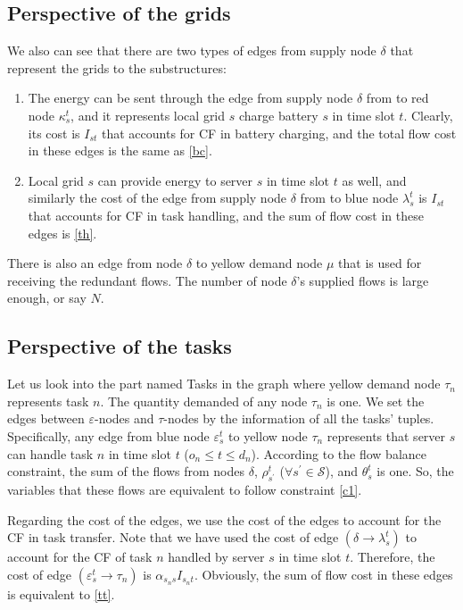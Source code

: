 \documentclass[conference, 10pt, ﬁnal, letterpaper, twocolumn]{IEEEtran}
\begin{document}
\subsection{Perspective of the grids}

We also can see that there are two types of edges from supply node $\delta$ that represent the grids to the substructures:
\begin{enumerate}
    \item The energy can be sent through the edge from supply node $\delta$ from to red node $\kappa^{t}_{s}$, and it represents local grid $s$ charge battery $s$ in time slot $t$. Clearly, its cost is $I_{st}$ that accounts for CF in battery charging, and the total flow cost in these edges is the same as \eqref{bc}.
    \item Local grid $s$ can provide energy to server $s$ in time slot $t$ as well, and similarly the cost of the edge from supply node $\delta$ from to blue node $\lambda^{t}_{s}$ is $I_{st}$ that accounts for CF in task handling, and the sum of flow cost in these edges is \eqref{th}.
\end{enumerate}
There is also an edge from node $\delta$ to yellow demand node $\mu$ that is used for receiving the redundant flows. The number of node $\delta$'s supplied flows is large enough, or say $N$. 

\subsection{Perspective of the tasks}

Let us look into the part named Tasks in the graph where yellow demand node $\tau_n$ represents task $n$. The quantity demanded of any node $\tau_n$ is one. We set the edges between $\varepsilon$-nodes and $\tau$-nodes by the information of all the tasks' tuples. Specifically, any edge from blue node $\varepsilon^{t}_{s}$ to yellow node $\tau_{n}$ represents that server $s$ can handle task $n$ in time slot $t$ ($o_n \leq t \leq d_n$). According to the flow balance constraint, the sum of the flows from nodes $\delta$, $\rho^{t}_{s^\prime}$ ($\forall s^\prime \in \mathcal{S}$), and $\theta^{t}_{s}$ is one. So, the variables that these flows are equivalent to follow constraint \eqref{c1}.

Regarding the cost of the edges, we use the cost of the edges to account for the CF in task transfer. Note that we have used the cost of edge $(\delta\rightarrow\lambda^{t}_{s})$ to account for the CF of task $n$ handled by server $s$ in time slot $t$. Therefore, the cost of edge $(\varepsilon^{t}_{s}\rightarrow\tau_n)$ is $\alpha_{s_{n}s}I_{s_{n}t}$. Obviously, the sum of flow cost in these edges is equivalent to \eqref{tt}.
\end{document}

